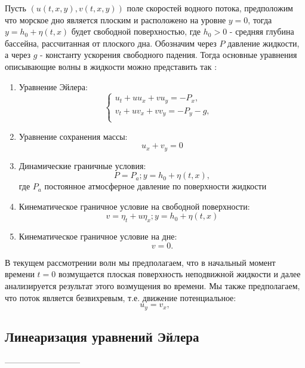 Пусть $(u(t, x, y), v(t, x, y))$ поле скоростей водного потока, предположим что морское дно является плоским и расположено на уровне $y=0$, тогда $y = h_0 + \eta(t, x)$ будет свободной поверхностью, где $h_0>0$ - средняя глубина бассейна, рассчитанная от плоского дна.  Обозначим через $P$ давление жидкости, а через $g$ - константу ускорения свободного падения. Тогда основные уравнения описывающие волны в жидкости можно представить так \cite{Esher_Schlurmann_2008} \cite{17_Johnson}:
\begin{enumerate}
  \item Уравнение Эйлера:
  \begin{equation}\label{eq:eulerLin}
    \begin{cases}
        u_t + uu_x + vu_y = -P_x,  & \\
        v_t + uv_x + vv_y = -P_y - g, & \\
    \end{cases}
  \end{equation}
  \item Уравнение сохранения массы:
  \begin{equation}\label{eq:massConserv}
    u_x + v_y = 0
  \end{equation}
  \item Динамические граничные условия:
  \begin{equation}\label{eq:dinGranCond}
      P = P_a; y = h_0 + \eta (t, x),
  \end{equation}
  где $P_a$ постоянное атмосферное давление по поверхности жидкости
  \item Кинематическое граничное условие на свободной поверхности:
  \begin{equation}\label{eq:kinGranCond}
       v = \eta_t + u\eta_x;  y = h_0 + \eta(t, x)
  \end{equation}
  \item Кинематическое граничное условие на дне:
  \begin{equation}\label{eq:kinGranCond_Bed}
       v = 0.
  \end{equation}
\end{enumerate}

В текущем рассмотрении волн мы предполагаем, что в начальный момент времени $t = 0$ возмущается плоская поверхность неподвижной жидкости и далее анализируется результат этого возмущения во времени. Мы также предполагаем, что поток является безвихревым, т.е. движение потенциальное:
$$
u_y=v_x,
$$

\subsection{Линеаризация уравнений Эйлера} \label{sect_linTheory_norming}
---------------------------

